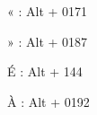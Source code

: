 \documentclass{article}
\begin{document}
« : Alt + 0171\par
» : Alt + 0187\par
É : Alt + 144\par
À : Alt + 0192\par
\end{document}
